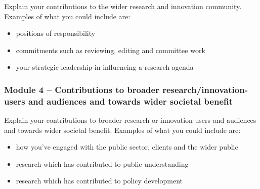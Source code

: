 \begin{instruction}
Explain your contributions to the wider research and innovation community.
Examples of what you could include are:
\begin{itemize}
    \item positions of responsibility
    \item commitments such as reviewing, editing and committee work
    \item your strategic leadership in influencing a research agenda
\end{itemize}
\end{instruction}



\subsubsection*{Module 4 – Contributions to broader research/innovation-users and audiences and towards wider societal benefit}

\begin{instruction}

Explain your contributions to broader research or innovation users and
audiences and towards wider societal benefit. Examples of what you could
include are:

\begin{itemize}
    \item  how you've engaged with the public sector, clients and the wider public
    \item  research which has contributed to public understanding
    \item  research which has contributed to policy development
\end{itemize}

\end{instruction}


